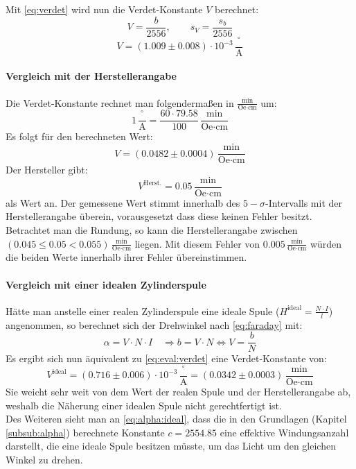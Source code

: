 Mit \autoref{eq:verdet} wird nun die Verdet-Konstante $V$ berechnet:
\begin{equation}
  \label{eq:eval:verdet}
  V = \frac{b}{2556}, \qquad s_V = \frac{s_b}{2556}
\end{equation}
\begin{equation}
  V = (1.009 \pm 0.008) \cdot 10^{-3}\,\frac{{}^\circ}{\text{A}}
\end{equation}

\paragraph{Vergleich mit der Herstellerangabe}
Die Verdet-Konstante rechnet man folgendermaßen in $\frac{\text{min}}{\text{Oe}\cdot \text{cm}}$ um:
\begin{equation}
  1\,\frac{{}^\circ}{\text{A}} = \frac{60\cdot 79.58}{100}\,\frac{\text{min}}{\text{Oe}\cdot \text{cm}}
\end{equation}
Es folgt für den berechneten Wert:
\begin{equation}
  V = (0.0482 \pm 0.0004)\,\frac{\text{min}}{\text{Oe}\cdot \text{cm}}
\end{equation}
Der Hersteller gibt:
\begin{equation}
  V^{\text{Herst.}} = 0.05\,\frac{\text{min}}{\text{Oe}\cdot \text{cm}}
\end{equation}
als Wert an. Der gemessene Wert stimmt innerhalb des $5-\sigma$-Intervalls mit der Herstellerangabe überein, vorausgesetzt dass diese keinen Fehler 
besitzt. Betrachtet man die Rundung, so kann die Herstellerangabe zwischen $(0.045 \leq 0.05 < 0.055)\,\frac{\text{min}}{\text{Oe}\cdot \text{cm}}$ liegen. 
Mit diesem Fehler von $0.005\,\frac{\text{min}}{\text{Oe}\cdot \text{cm}}$  würden die beiden Werte innerhalb ihrer Fehler übereinstimmen.

\paragraph{Vergleich mit einer idealen Zylinderspule}
Hätte man anstelle einer realen Zylinderspule eine ideale Spule ($H^{\text{ideal}} = \frac{N \cdot I}{l}$) angenommen, 
so berechnet sich der Drehwinkel nach \autoref{eq:faraday} mit:
\begin{equation}
  \label{eq:alpha:ideal}
  \alpha = V \cdot N \cdot I \quad \Rightarrow b = V \cdot N \Leftrightarrow V = \frac{b}{N}
\end{equation}
Es ergibt sich nun äquivalent zu \autoref{eq:eval:verdet} eine Verdet-Konstante von:
\begin{equation}
  V^{\text{ideal}} = (0.716 \pm 0.006) \cdot 10^{-3}\,\frac{{}^\circ}{\text{A}} = (0.0342 \pm 0.0003)\,\frac{\text{min}}{\text{Oe}\cdot \text{cm}}
\end{equation}
Sie weicht sehr weit von dem Wert der realen Spule und der Herstellerangabe ab, weshalb die Näherung einer idealen Spule nicht gerechtfertigt ist. \\
Des Weiteren sieht man an \autoref{eq:alpha:ideal}, dass die in den Grundlagen (Kapitel \ref{subsub:alpha}) berechnete Konstante 
$c = 2554.85$ eine effektive Windungsanzahl darstellt, die eine ideale Spule besitzen müsste, um das Licht um den gleichen Winkel zu drehen.
